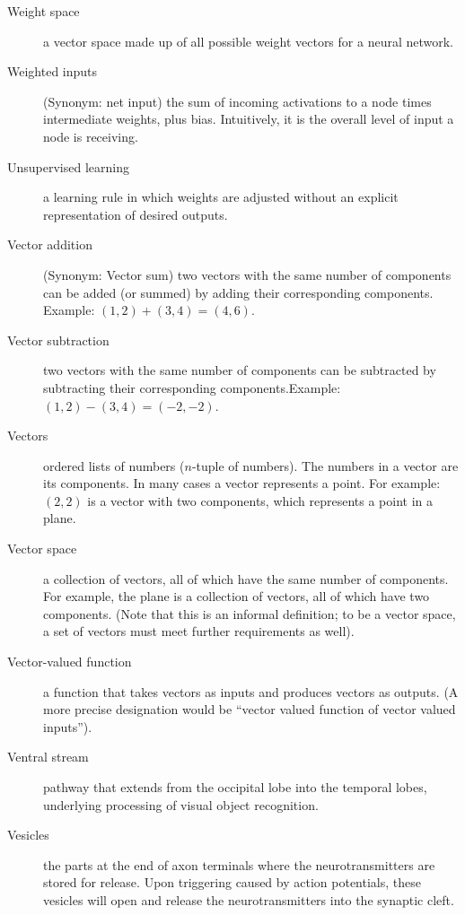 \begin{description}
\item[Weight space] a vector space made up of all possible weight vectors for a neural network.

\item[Weighted inputs] (Synonym: net input) the sum of incoming activations to a node times intermediate weights, plus bias. Intuitively, it is the overall level of input a node is receiving.

\item[Unsupervised learning] a learning rule in which weights are adjusted without an explicit representation of desired outputs.

\item[Vector addition] (Synonym: Vector sum) two vectors with the same number of components can be added (or summed) by adding their corresponding components. Example: $(1,2) + (3,4) = (4,6)$.

\item[Vector subtraction] two vectors with the same number of components can be subtracted by subtracting their corresponding components.Example: $(1,2) - (3,4) = (-2,-2)$.

\item[Vectors] ordered lists of numbers ($n$-tuple of numbers). The numbers in a vector are its components. In many cases a vector represents a point. For example: $(2,2)$ is a vector with two components, which represents a point in a plane.

\item[Vector space] a collection of vectors, all of which have the same number of components. For example, the plane is a collection of vectors, all of which have two components. (Note that this is an  informal definition; to be a vector space, a set of vectors must meet further requirements as well).

\item[Vector-valued function] a function that takes vectors as inputs and produces vectors as outputs. (A more precise designation would be ``vector valued function of vector valued inputs''). 

\item[Ventral stream] pathway that extends from the occipital lobe into the temporal lobes, underlying processing of visual object recognition. 

\item[Vesicles] the parts at the end of axon terminals where the neurotransmitters are stored for release. Upon triggering caused by action potentials, these vesicles will open and release the neurotransmitters into the synaptic cleft.


\end{description}
